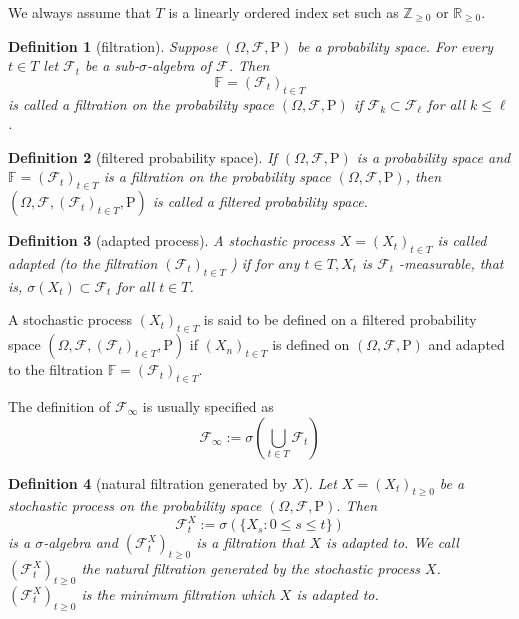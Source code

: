 \documentclass{report}
\newtheorem{definition}{Definition}[section]
\theoremstyle{nonumberplain}
\begin{document}
We always assume that $T$ is a linearly ordered index set such as $\mathbb{Z}_{\ge 0}$ or $\mathbb{R}_{\ge 0}$.
\begin{definition}[filtration]
	Suppose $(\Omega,\mathcal{F},\mathrm{P})$ be a probability space. For every $t\in T$ let $\mathcal{F}_{t}$ be a sub-$\sigma$-algebra of $\mathcal{F}$. Then
	\[
	\mathbb{F} =(\mathcal{F}_{t})_{t\in T}
	\]
	is called a \emph{filtration} on the probability space $(\Omega,\mathcal{F},\mathrm{P})$ if $\mathcal {F}_{k}\subset \mathcal{F}_{\ell}$ for all $k\leq \ell$. 
\end{definition}
\begin{definition}[filtered probability space]
	If $(\Omega,\mathcal{F},\mathrm{P})$ is a probability space and $ \mathbb {F}=(\mathcal{F}_{t})_{t\in T }$ is a filtration on the probability space $(\Omega,\mathcal{F},\mathrm{P})$, then $(\Omega,\mathcal{F},(\mathcal{F}_{t})_{t\in T },\mathrm{P})$ is called a \emph{filtered probability space}.
\end{definition}

\begin{definition}[adapted process]
	A stochastic process $X=(X_{t})_{t \in T}$ is called \emph{adapted} (to the filtration $(\mathcal{F}_{t})_{t\in T}$ ) if for any $t \in T, X_{t}$ is $\mathcal{F}_{t}$ -measurable, that is, $\sigma(X_t)\subset \mathcal{F}_t$ for all $t\in T$.
\end{definition}

A stochastic process $(X_{t})_{t\in T }$ is said to be defined on a filtered probability space $(\Omega,\mathcal{F},(\mathcal{F}_{t})_{t\in T },\mathrm{P})$ if $(X_{n})_{t\in T }$ is defined on $(\Omega,\mathcal{F},\mathrm{P})$ and adapted to the filtration $\mathbb{F} =(\mathcal{F}_{t})_{t\in T }$. 

The definition of $\mathcal{F}_{\infty}$ is usually specified as
\[
\mathcal{F}_{\infty}:=\sigma\left(\bigcup_{t\in T} \mathcal{F}_t\right)
\]

\begin{definition}[natural filtration generated by $X$]
	Let $X=(X_{t})_{t\ge 0}$ be a stochastic process on the probability space $(\Omega,\mathcal{F},\mathrm{P})$. Then 
	\[
	{\mathcal {F}}_{t}^X:=\sigma (\{X_{s}:0\le s\le t\})
	\]
	is a $\sigma$-algebra and $(\mathcal {F}_{t}^X)_{t\ge0} $ is a filtration that $X$ is adapted to. We call $(\mathcal {F}_{t}^X)_{t\ge0} $ the \emph{natural filtration generated by the stochastic process $X$}. $(\mathcal {F}_{t}^X)_{t\ge0} $ is the minimum filtration which $X$ is adapted to.
\end{definition}
\end{document}
